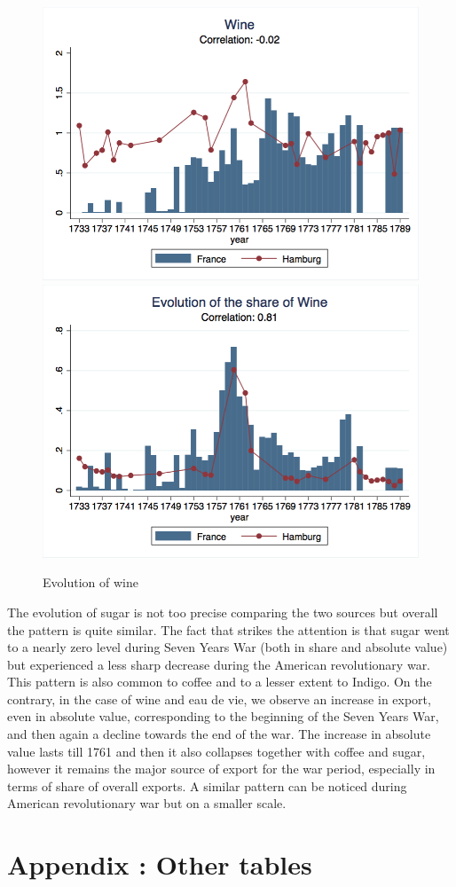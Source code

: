 \documentclass[12pt,a4paper,titlepage,english]{article}
\begin{document}
\begin{figure}
\caption{Evolution of wine}
\includegraphics[scale=.28]{wine_long.png}
\includegraphics[scale=.28]{wine_share_long.png}\\
\end{figure}
The evolution of sugar is not too precise comparing the two sources but overall the pattern is quite similar. The fact that strikes the attention is that sugar went to a nearly zero level during Seven Years War (both in share and absolute value) but experienced a less sharp decrease during the American revolutionary war. This pattern is also common to coffee and to a lesser extent to Indigo. On the contrary, in the case of wine and eau de vie, we observe an increase in export, even in absolute value, corresponding to the beginning of the Seven Years War, and then again a decline towards the end of the war. The increase in absolute value lasts till 1761 and then it also collapses together with coffee and sugar, however it remains the major source of export for the war period, especially in terms of share of overall exports. A similar pattern can be noticed during American revolutionary war but on a smaller scale. 
\pagebreak

\section{Appendix : Other tables}
\begin{table}


\end{table}
\pagebreak



\end{document}
